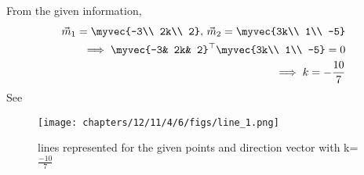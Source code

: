 From the given information,
\begin{align}
\vec{m}_1 = \myvec{-3\\ 2k\\ 2},\,  \vec{m}_2 =\myvec{3k\\ 1\\ -5} 
\\
	\implies \myvec{-3& 2k& 2}^{\top} \myvec{3k\\ 1\\ -5} =0
	\\
	\implies k = -\frac{10}{7}
\end{align}
See 
\begin{figure}[H]
  \centering
   \texttt{[image: chapters/12/11/4/6/figs/line\_1.png]}
    \caption{lines represented for the given points and direction vector with k=$\frac{-10}{7}$}
     \label{fig:chapters/12/11/4/6/1}
     \end{figure}  


